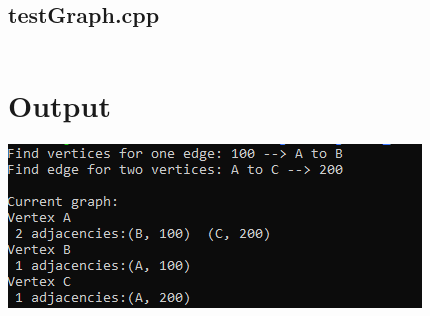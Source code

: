 \documentclass{article}
\begin{document}
\subsection{testGraph.cpp}
\inputminted{c++}{../src/testGraph.cpp}

\section{Output}
\includegraphics[]{output.png}
\end{document}
